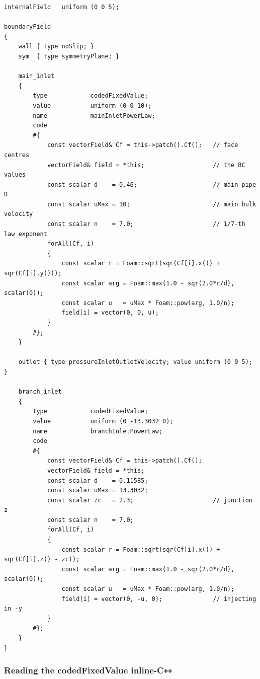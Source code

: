 \documentclass[11pt,a4paper]{article}
\begin{document}
\begin{lstlisting}[style=foamstyle,caption={\texttt{0/U} -- 90\textdegree{} version (case~03)}]
internalField   uniform (0 0 5);

boundaryField
{
    wall { type noSlip; }
    sym  { type symmetryPlane; }

    main_inlet
    {
        type            codedFixedValue;
        value           uniform (0 0 10);
        name            mainInletPowerLaw;
        code
        #{
            const vectorField& Cf = this->patch().Cf();   // face centres
            vectorField& field = *this;                   // the BC values
            const scalar d    = 0.46;                     // main pipe D
            const scalar uMax = 10;                       // main bulk velocity
            const scalar n    = 7.0;                      // 1/7-th law exponent
            forAll(Cf, i)
            {
                const scalar r = Foam::sqrt(sqr(Cf[i].x()) + sqr(Cf[i].y()));
                const scalar arg = Foam::max(1.0 - sqr(2.0*r/d), scalar(0));
                const scalar u   = uMax * Foam::pow(arg, 1.0/n);
                field[i] = vector(0, 0, u);
            }
        #};
    }

    outlet { type pressureInletOutletVelocity; value uniform (0 0 5); }

    branch_inlet
    {
        type            codedFixedValue;
        value           uniform (0 -13.3032 0);
        name            branchInletPowerLaw;
        code
        #{
            const vectorField& Cf = this->patch().Cf();
            vectorField& field = *this;
            const scalar d    = 0.11585;
            const scalar uMax = 13.3032;
            const scalar zc   = 2.3;                      // junction z
            const scalar n    = 7.0;
            forAll(Cf, i)
            {
                const scalar r = Foam::sqrt(sqr(Cf[i].x()) + sqr(Cf[i].z() - zc));
                const scalar arg = Foam::max(1.0 - sqr(2.0*r/d), scalar(0));
                const scalar u   = uMax * Foam::pow(arg, 1.0/n);
                field[i] = vector(0, -u, 0);              // injecting in -y
            }
        #};
    }
}
\end{lstlisting}

\subsubsection{Reading the codedFixedValue inline-C\texttt{++}}
\end{document}

